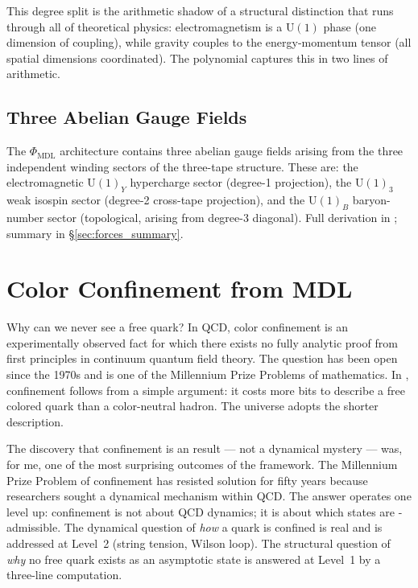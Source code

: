 \documentclass[11pt,openany]{book}
\theoremstyle{remark}
\newcommand{\GTE}{\text{GTE}}
\newcommand{\MDL}{\text{MDL}}
\newcommand{\PHIMDL}{\Phi_{\mathrm{MDL}}}
\begin{document}
This degree split is the arithmetic shadow of a structural distinction that runs through
all of theoretical physics: electromagnetism is a $\mathrm{U}(1)$ phase (one dimension of
coupling), while gravity couples to the energy-momentum tensor (all spatial dimensions
coordinated).  The polynomial captures this in two lines of arithmetic.

\subsection*{Three Abelian Gauge Fields}

The $\PHIMDL$ architecture contains three abelian gauge fields arising from the three
independent winding sectors of the three-tape structure.  These are: the electromagnetic
$\mathrm{U}(1)_Y$ hypercharge sector (degree-1 projection), the $\mathrm{U}(1)_3$ weak
isospin sector (degree-2 cross-tape projection), and the $\mathrm{U}(1)_B$ baryon-number
sector (topological, arising from degree-3 diagonal).  Full derivation in
\cite{SpivackGTEQCDStructure,SpivackGTEPolynomialUFT}; summary in \S\ref{sec:forces_summary}.

\section{Color Confinement from MDL}
\label{sec:confinement}

Why can we never see a free quark?  In QCD, color confinement is an experimentally
observed fact for which there exists no fully analytic proof from first principles in
continuum quantum field theory.  The question has been open since the 1970s and is one of
the Millennium Prize Problems of mathematics.  In \GTE{}, confinement follows from a
simple \MDL{} argument: it costs more bits to describe a free colored quark than a
color-neutral hadron.  The universe adopts the shorter description.

The discovery that confinement is an \MDL{} result --- not a dynamical mystery ---
was, for me, one of the most surprising outcomes of the framework.  The Millennium
Prize Problem of confinement has resisted solution for fifty years because researchers
sought a dynamical mechanism within QCD.  The \GTE{} answer operates one level up:
confinement is not about QCD dynamics; it is about which states are \MDL-admissible.
The dynamical question of \emph{how} a quark is confined is real and is addressed at
Level~2 (string tension, Wilson loop).  The structural question of \emph{why} no free
quark exists as an asymptotic state is answered at Level~1 by a three-line computation.
\end{document}
